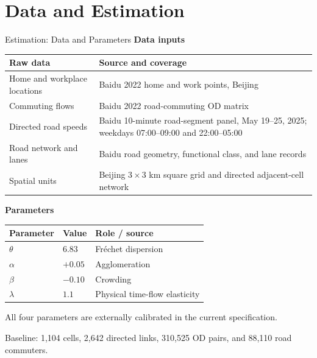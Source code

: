 \documentclass[11pt,aspectratio=169]{beamer}
\newcommand{\app}[1]{\allowbreak\hspace{0.25em}\hyperlink{#1}{\beamergotobutton{details}}}
\begin{document}
\section{Data and Estimation}\label{sec:quant}
\begin{frame}[label=estparams]{Estimation: Data and Parameters}
\small\textbf{Data inputs}\par
\vspace{0.25em}
\scriptsize
\begin{tabularx}{0.94\textwidth}{@{}p{}X@{}}
\toprule
Raw data & Source and coverage \tabularnewline
\midrule
Home and workplace locations & Baidu 2022 home and work points, Beijing \tabularnewline
Commuting flows & Baidu 2022 road-commuting OD matrix \tabularnewline
Directed road speeds & Baidu 10-minute road-segment panel, May 19--25, 2025; weekdays 07:00--09:00 and 22:00--05:00 \tabularnewline
Road network and lanes & Baidu road geometry, functional class, and lane records \tabularnewline
Spatial units & Beijing $3\times3$ km square grid and directed adjacent-cell network \tabularnewline
\bottomrule
\end{tabularx}

\vspace{0.80em}
\small\textbf{Parameters}\par
\vspace{0.25em}
\scriptsize
\begin{tabularx}{0.94\textwidth}{@{}p{}p{}X@{}}
\toprule
Parameter & Value & Role / source \tabularnewline
\midrule
$\theta$ & $6.83$ & Fr\'echet dispersion \citep{ahlfeldt2015,allenarkolakis2022} \tabularnewline
$\alpha$ & $+0.05$ & Agglomeration \tabularnewline
$\beta$ & $-0.10$ & Crowding \tabularnewline
$\lambda$ & $1.1$ & Physical time-flow elasticity \citep{barwick2024} \tabularnewline
\bottomrule
\end{tabularx}
\vspace{0.45em}

{\footnotesize All four parameters are externally calibrated in the current specification. \app{appparams}}
\vspace{0.30em}

{\tiny Baseline: 1,104 cells, 2,642 directed links, 310,525 OD pairs, and 88,110 road commuters.}
\end{frame}
\end{document}
